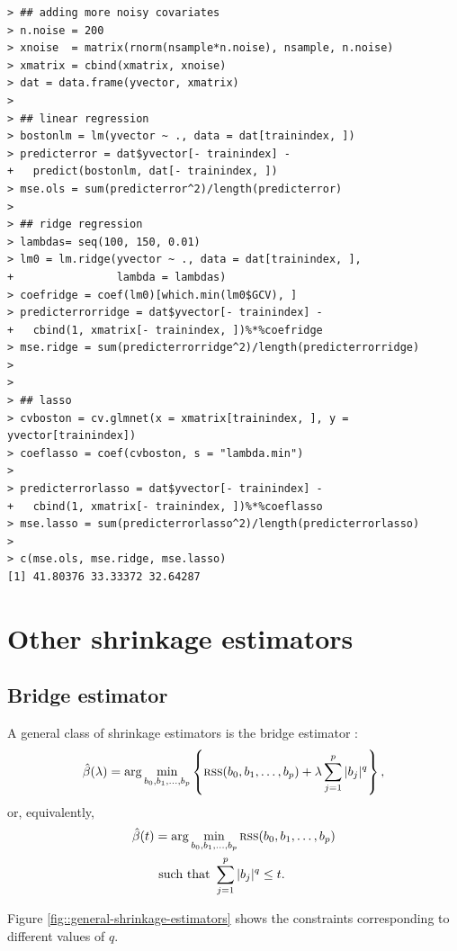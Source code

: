 \begin{lstlisting}
> ## adding more noisy covariates
> n.noise = 200
> xnoise  = matrix(rnorm(nsample*n.noise), nsample, n.noise)
> xmatrix = cbind(xmatrix, xnoise)
> dat = data.frame(yvector, xmatrix)
> 
> ## linear regression
> bostonlm = lm(yvector ~ ., data = dat[trainindex, ])
> predicterror = dat$yvector[- trainindex] - 
+   predict(bostonlm, dat[- trainindex, ])
> mse.ols = sum(predicterror^2)/length(predicterror)
> 
> ## ridge regression 
> lambdas= seq(100, 150, 0.01)
> lm0 = lm.ridge(yvector ~ ., data = dat[trainindex, ],
+                lambda = lambdas)
> coefridge = coef(lm0)[which.min(lm0$GCV), ]
> predicterrorridge = dat$yvector[- trainindex] -
+   cbind(1, xmatrix[- trainindex, ])%*%coefridge
> mse.ridge = sum(predicterrorridge^2)/length(predicterrorridge)
> 
> 
> ## lasso 
> cvboston = cv.glmnet(x = xmatrix[trainindex, ], y = yvector[trainindex])
> coeflasso = coef(cvboston, s = "lambda.min")
> 
> predicterrorlasso = dat$yvector[- trainindex] -
+   cbind(1, xmatrix[- trainindex, ])%*%coeflasso
> mse.lasso = sum(predicterrorlasso^2)/length(predicterrorlasso)
> 
> c(mse.ols, mse.ridge, mse.lasso)
[1] 41.80376 33.33372 32.64287
\end{lstlisting}



 
 

\section{Other shrinkage estimators}


 

\subsection{Bridge estimator}


A general class of shrinkage estimators is the bridge estimator \citep{frank1993statistical}: 
\[
\hat{\beta}(\lambda)=\arg\min_{b_{0},b_{1},\ldots,b_{p}}\left\{ \textsc{rss}(b_0,b_1,\ldots,b_p) +\lambda\sum_{j=1}^{p}|b_{j}|^{q}\right\} , 
\]
or, equivalently, 
\begin{align*}
\hat{\beta}(t) & =\arg\min_{b_{0},b_{1},\ldots,b_{p}} \textsc{rss}(b_0,b_1,\ldots,b_p)  \\
 & \ \text{such that }\sum_{j=1}^{p}|b_{j}|^{q}\ensuremath{\leq t.}
\end{align*}

Figure \ref{fig::general-shrinkage-estimators} shows the constraints corresponding to different values of $q$. 



